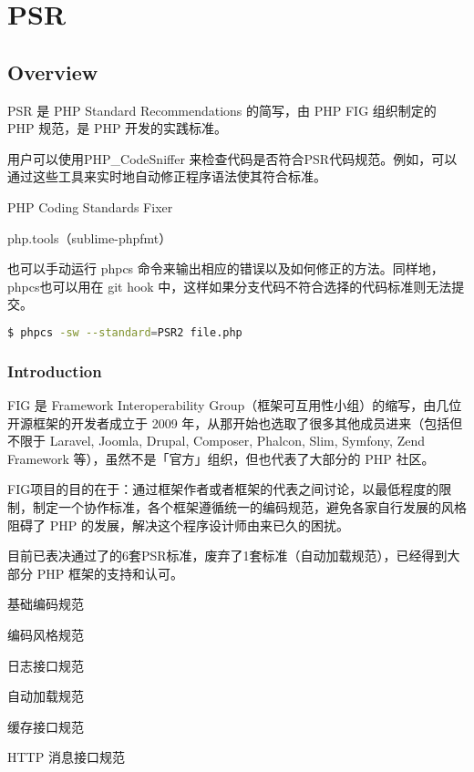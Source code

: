 \part{PSR}


\chapter{Overview}




PSR 是 PHP Standard Recommendations 的简写，由 PHP FIG 组织制定的 PHP 规范，是 PHP 开发的实践标准。

用户可以使用PHP\_CodeSniffer 来检查代码是否符合PSR代码规范。例如，可以通过这些工具来实时地自动修正程序语法使其符合标准。 

\begin{compactitem}
\item PHP Coding Standards Fixer
\item php.tools（sublime-phpfmt）
\end{compactitem}


也可以手动运行 phpcs 命令来输出相应的错误以及如何修正的方法。同样地，phpcs也可以用在 git hook 中，这样如果分支代码不符合选择的代码标准则无法提交。

\begin{lstlisting}[language=bash]
$ phpcs -sw --standard=PSR2 file.php
\end{lstlisting}





\section{Introduction}

FIG 是 Framework Interoperability Group（框架可互用性小组）的缩写，由几位开源框架的开发者成立于 2009 年，从那开始也选取了很多其他成员进来（包括但不限于 Laravel, Joomla, Drupal, Composer, Phalcon, Slim, Symfony, Zend Framework 等），虽然不是「官方」组织，但也代表了大部分的 PHP 社区。

FIG项目的目的在于：通过框架作者或者框架的代表之间讨论，以最低程度的限制，制定一个协作标准，各个框架遵循统一的编码规范，避免各家自行发展的风格阻碍了 PHP 的发展，解决这个程序设计师由来已久的困扰。

目前已表决通过了的6套PSR标准，废弃了1套标准（自动加载规范），已经得到大部分 PHP 框架的支持和认可。

\begin{compactitem}
\item 基础编码规范
\item 编码风格规范
\item 日志接口规范
\item 自动加载规范
\item 缓存接口规范
\item HTTP 消息接口规范
\end{compactitem}

